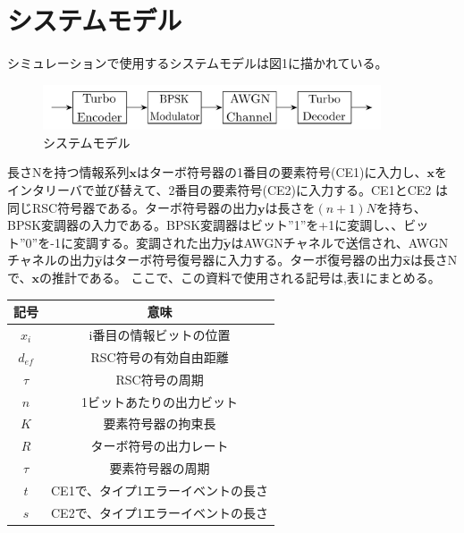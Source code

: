 \documentclass[20 pts]{article}
\begin{document}
\section{システムモデル}
シミュレーションで使用するシステムモデルは図1に描かれている。
\begin{figure}[h!]
\includegraphics[width=10cm]{figure4.pdf}
\caption{システムモデル}
\label{}
\end{figure}
長さNを持つ情報系列$\mathbf{x}$はターボ符号器の1番目の要素符号(CE1)に入力し、$\mathbf{x}$をインタリーバで並び替えて、2番目の要素符号(CE2)に入力する。CE1とCE2 は同じRSC符号器である。ターボ符号器の出力$\mathbf{y}$は長さを$(n+1)N$を持ち、BPSK変調器の入力である。BPSK変調器はビット''1''を+1に変調し、、ビット''0''を-1に変調する。変調された出力$\mathbf{\widetilde{y}}$はAWGNチャネルで送信され、AWGNチャネルの出力$\mathbf{\widehat{y}}$はターボ符号復号器に入力する。ターボ復号器の出力$\mathbf{\widehat{x}}$は長さNで、$\mathbf{x}$の推計である。
ここで、この資料で使用される記号は,表1にまとめる。


\begin{center}
 \begin{tabular}{||c c||} 
 \hline
 記号 & 意味\\ [0.5ex] 
 \hline\hline
 $x_i$ & i番目の情報ビットの位置  \\ 
 
  $d_{ef}$ &RSC符号の有効自由距離  \\ 
  
   $\tau$ & RSC符号の周期  \\ 
 
 $n$ & 1ビットあたりの出力ビット  \\
 
 $K$ & 要素符号器の拘束長 \\
 
 $R$ & ターボ符号の出力レート \\
 
 $\tau$ &  要素符号器の周期 \\
 
 $t$ & CE1で、タイプ1エラーイベントの長さ\\ 
 
  $s$ & CE2で、タイプ1エラーイベントの長さ\\ [1ex] 
 \hline
\end{tabular}
\end{center}
\end{document}
